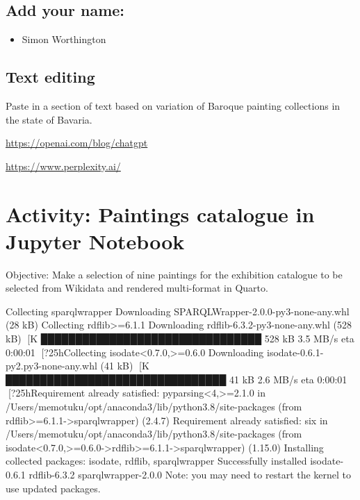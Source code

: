 \documentclass[
  letterpaper,
]{book}
\providecommand{\tightlist}{%
  \setlength{\itemsep}{0pt}\setlength{\parskip}{0pt}}\usepackage{longtable,booktabs,array}
\begin{document}
\hypertarget{add-your-name}{%
\section{Add your name:}\label{add-your-name}}

\begin{itemize}
\tightlist
\item
  Simon Worthington
\end{itemize}

\hypertarget{text-editing}{%
\section{Text editing}\label{text-editing}}

Paste in a section of text based on variation of Baroque painting
collections in the state of Bavaria.

\url{https://openai.com/blog/chatgpt}

\url{https://www.perplexity.ai/}


\hypertarget{activity-paintings-catalogue-in-jupyter-notebook}{%
\chapter{Activity: Paintings catalogue in Jupyter
Notebook}\label{activity-paintings-catalogue-in-jupyter-notebook}}

Objective: Make a selection of nine paintings for the exhibition
catalogue to be selected from Wikidata and rendered multi-format in
Quarto.

Collecting sparqlwrapper Downloading
SPARQLWrapper-2.0.0-py3-none-any.whl (28 kB) Collecting
rdflib\textgreater=6.1.1 Downloading rdflib-6.3.2-py3-none-any.whl (528
kB) {[}K \textbar████████████████████████████████\textbar{} 528 kB 3.5
MB/s eta 0:00:01 {[}?25hCollecting
isodate\textless0.7.0,\textgreater=0.6.0 Downloading
isodate-0.6.1-py2.py3-none-any.whl (41 kB) {[}K
\textbar████████████████████████████████\textbar{} 41 kB 2.6 MB/s eta
0:00:01 {[}?25hRequirement already satisfied:
pyparsing\textless4,\textgreater=2.1.0 in
/Users/memotuku/opt/anaconda3/lib/python3.8/site-packages (from
rdflib\textgreater=6.1.1-\textgreater sparqlwrapper) (2.4.7) Requirement
already satisfied: six in
/Users/memotuku/opt/anaconda3/lib/python3.8/site-packages (from
isodate\textless0.7.0,\textgreater=0.6.0-\textgreater rdflib\textgreater=6.1.1-\textgreater sparqlwrapper)
(1.15.0) Installing collected packages: isodate, rdflib, sparqlwrapper
Successfully installed isodate-0.6.1 rdflib-6.3.2 sparqlwrapper-2.0.0
Note: you may need to restart the kernel to use updated packages.
\end{document}
